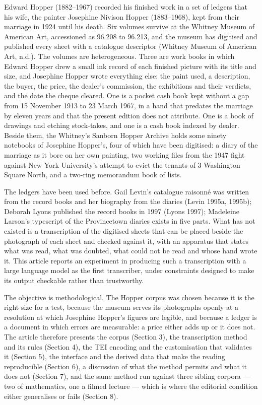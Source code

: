 \documentclass[11pt]{article}
\begin{document}
Edward Hopper (1882--1967) recorded his finished work in a set of ledgers that his wife, the painter Josephine Nivison Hopper (1883--1968), kept from their marriage in 1924 until his death. Six volumes survive at the Whitney Museum of American Art, accessioned as 96.208 to 96.213, and the museum has digitised and published every sheet with a catalogue descriptor (Whitney Museum of American Art, n.d.). The volumes are heterogeneous. Three are work books in which Edward Hopper drew a small ink record of each finished picture with its title and size, and Josephine Hopper wrote everything else: the paint used, a description, the buyer, the price, the dealer's commission, the exhibitions and their verdicts, and the date the cheque cleared. One is a pocket cash book kept without a gap from 15 November 1913 to 23 March 1967, in a hand that predates the marriage by eleven years and that the present edition does not attribute. One is a book of drawings and etching stock-takes, and one is a cash book indexed by dealer. Beside them, the Whitney's Sanborn Hopper Archive holds some ninety notebooks of Josephine Hopper's, four of which have been digitised: a diary of the marriage as it bore on her own painting, two working files from the 1947 fight against New York University's attempt to evict the tenants of 3 Washington Square North, and a two-ring memorandum book of lists.

The ledgers have been used before. Gail Levin's catalogue raisonné was written from the record books and her biography from the diaries (Levin 1995a, 1995b); Deborah Lyons published the record books in 1997 (Lyons 1997); Madeleine Larson's typescript of the Provincetown diaries exists in five parts. What has not existed is a transcription of the digitised sheets that can be placed beside the photograph of each sheet and checked against it, with an apparatus that states what was read, what was doubted, what could not be read and whose hand wrote it. This article reports an experiment in producing such a transcription with a large language model as the first transcriber, under constraints designed to make its output checkable rather than trustworthy.

The objective is methodological. The Hopper corpus was chosen because it is the right size for a test, because the museum serves its photographs openly at a resolution at which Josephine Hopper's figures are legible, and because a ledger is a document in which errors are measurable: a price either adds up or it does not. The article therefore presents the corpus (Section 3), the transcription method and its rules (Section 4), the TEI encoding and the customisation that validates it (Section 5), the interface and the derived data that make the reading reproducible (Section 6), a discussion of what the method permits and what it does not (Section 7), and the same method run against three sibling corpora — two of mathematics, one a filmed lecture — which is where the editorial condition either generalises or fails (Section 8).
\end{document}
